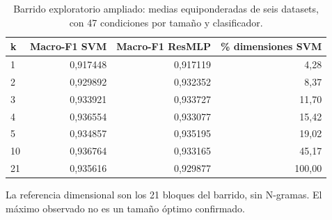 \begin{table}[!htbp]\centering
\fontsize{9}{11}\selectfont\setlength{\tabcolsep}{4pt}
\caption{Barrido exploratorio ampliado: medias equiponderadas de seis datasets, con 47 condiciones por tamaño y clasificador.}\label{tab:tm-curva}
\begin{tabular}{@{}lrrr@{}}\toprule
k & Macro-F1 SVM & Macro-F1 ResMLP & \% dimensiones SVM\\\midrule
1 & 0,917448 & 0,917119 & 4,28\\
2 & 0,929892 & 0,932352 & 8,37\\
3 & 0,933921 & 0,933727 & 11,70\\
4 & 0,936554 & 0,933077 & 15,42\\
5 & 0,934857 & 0,935195 & 19,02\\
10 & 0,936764 & 0,933165 & 45,17\\
21 & 0,935616 & 0,929877 & 100,00\\
\bottomrule\end{tabular}
\par\smallskip\begin{minipage}{0.98\textwidth}\footnotesize La referencia dimensional son los 21 bloques del barrido, sin N-gramas. El máximo observado no es un tamaño óptimo confirmado.\end{minipage}
\end{table}
